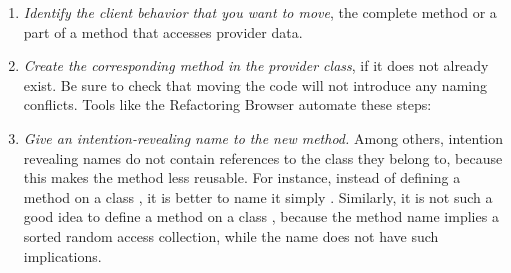 \documentclass[a4paper,10pt,twoside]{book}
\begin{document}
\begin{enumerate}
\item \emph{Identify the client behavior that you want to move}, \ie the complete method or a part of a method that accesses provider data.


\item \emph{Create the corresponding method in the provider class}, if it does not already exist. Be sure to check that moving the code will not introduce any naming conflicts. Tools like the Refactoring Browser \cite{Robe97a} automate these steps:


\item \emph{Give an intention-revealing name to the new method.} Among others, intention revealing names do not contain references to the class they belong to, because this makes the method less reusable. For instance, instead of defining a method  on a class , it is better to name it simply . Similarly, it is not such a good idea to define a method  on a class , because the method name implies a sorted random access collection, while the name  does not have such implications.


\end{enumerate}
\end{document}
